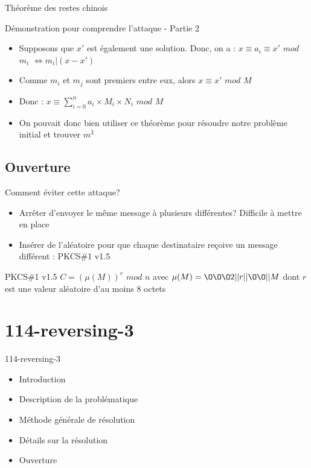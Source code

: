 \documentclass{beamer}
\begin{document}
	\begin{frame}{Théorème des restes chinois}
	\begin{alertblock}{Démonstration pour comprendre l'attaque - Partie 2}
	\begin{itemize}
		\item Supposons que $x'$ est également une solution.
		Donc, on a : \newline $x \equiv a_i \equiv x'$ $mod$ $m_i$
		$\Leftrightarrow m_i | (x-x')$
		\item Comme $m_i$ et $m_j$ sont premiers entre eux, alors $x \equiv x'$ $mod$ $M$
		\item Donc : $x \equiv \sum \limits_{i=0}^{n}a_i \times M_i \times N_i$ $mod$ $M$
		\item On pouvait donc bien utiliser ce théorème pour résoudre notre problème initial et trouver $m^3$
	\end{itemize}
	\end{alertblock}
	\end{frame}

	\subsection{Ouverture}

	\begin{frame}
	\begin{block}{Comment éviter cette attaque?}
		\begin{itemize}
			\item Arrêter d'envoyer le même message à plusieurs différentes? Difficile à mettre en place
			\item Insérer de l'aléatoire pour que chaque destinataire reçoive un message différent : PKCS\#1 v1.5
		\end{itemize}
	\end{block}
	\begin{exampleblock}{PKCS\#1 v1.5}
	$C=(\mu(M))^e$ $mod$ $n$ avec
	$\mu(M)=\O\O\O2||r||\O\O||M$ \newline dont $r$ est une valeur aléatoire d'au moins 8 octets
	\end{exampleblock}
	\end{frame}

	\section{114-reversing-3}

	\begin{frame}
	\begin{block}{114-reversing-3}
		\begin{itemize}
			\item Introduction
			\item Description de la problématique
			\item Méthode générale de résolution
			\item Détails sur la résolution
			\item Ouverture
		\end{itemize}
	\end{block}

	\end{frame}
\end{document}
